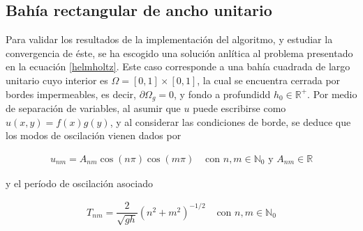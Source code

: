  \subsection{Bah\'ia rectangular de ancho unitario}
  Para validar los resultados de la implementaci\'on del algoritmo, y estudiar la convergencia de \'este, se ha escogido una soluci\'on anl\'itica al problema presentado en la ecuaci\'on \eqref{helmholtz}. Este caso corresponde a una bah\'ia cuadrada de largo unitario cuyo interior es $\Omega = [0,1]\times[0,1]$, la cual se encuentra cerrada por bordes impermeables, es decir, $\partial \Omega_g=0$, y fondo a profundidd $h_0\in\mathbb{R^+}$. Por medio de separaci\'on de variables, al asumir que $u$ puede escribirse como $u(x,y)=f(x)g(y)$, y al considerar las condiciones de borde, se deduce que los modos de oscilaci\'on vienen dados por 
  
  \begin{equation}
    \begin{array}{cc}
    u_{nm}=A_{nm}\cos(n\pi)\cos(m\pi) & \text{ con } n,m \in \mathbb{N}_0 \text{ y } A_{nm}\in\mathbb{R}
    \end{array}
    \label{eq:bahia_cerrada_modo}
  \end{equation}

  y el per\'iodo de oscilaci\'on asociado
  
  \begin{equation}
    \begin{array}{cc}
    T_{nm}=\dfrac{2}{\sqrt{gh}}\left( n^2+m^2\right)^{-1/2} & \text{ con } n,m \in \mathbb{N}_0
    \end{array}
    \label{eq:bahia_cerrada_periodo}
  \end{equation}
